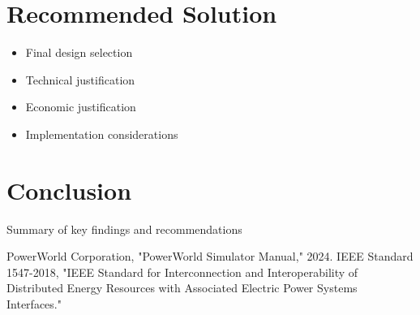 \documentclass[conference]{IEEEtran}
\begin{document}
	\section{Recommended Solution}
	\begin{itemize}
		\item Final design selection
		\item Technical justification
		\item Economic justification
		\item Implementation considerations
	\end{itemize}
	
	\section{Conclusion}
	Summary of key findings and recommendations
		
	\begin{thebibliography}{00}
		 PowerWorld Corporation, "PowerWorld Simulator Manual," 2024.
		 IEEE Standard 1547-2018, "IEEE Standard for Interconnection and Interoperability of Distributed Energy Resources with Associated Electric Power Systems Interfaces."
	\end{thebibliography}
	
\end{document}
